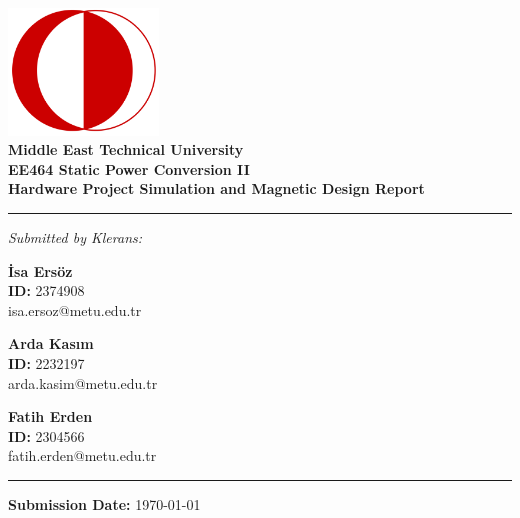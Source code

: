 \begin{titlepage}

\begin{center}

\includegraphics[width=0.3\textwidth]{Figures/metu_logo.png}\\
\vspace{.3in}
\textup{{\bf Middle East Technical University}}\\

\Large \textbf{EE464 Static Power Conversion II}\\[0.3in]
\Large \textbf{Hardware Project Simulation and Magnetic Design Report}\\

\noindent\rule{6cm}{0.4pt}

\normalsize \textit{Submitted by Klerans:} \\

\vspace{.3in}

\textbf{İsa Ersöz}\\
\textbf{ID:} 2374908 \\
isa.ersoz@metu.edu.tr\\

\vspace{.3in}

\textbf{Arda Kasım}\\
\textbf{ID:} 2232197\\
arda.kasim@metu.edu.tr\\

\vspace{.3in}

\textbf{Fatih Erden}\\
\textbf{ID:} 2304566\\
fatih.erden@metu.edu.tr\\

\noindent\rule{6cm}{0.4pt}

\vspace{.3in}

\textbf{Submission Date:} \today

\end{center}

\end{titlepage}